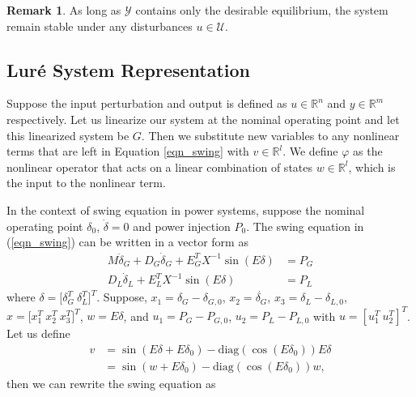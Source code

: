 \documentclass[journal]{IEEEtran}
\theoremstyle{definition}
\newtheorem*{remark}{Remark}
\begin{document}
\begin{remark}
As long as $\mathcal{Y}$ contains only the desirable equilibrium, the system remain stable under any disturbances $u\in\mathcal{U}$.
\end{remark}

\subsection{Lur\'e System Representation}
Suppose the input perturbation and output is defined as $u\in\mathbb{R}^{n}$ and $y\in\mathbb{R}^{m}$ respectively. Let us linearize our system at the nominal operating point and let this linearized system be $G$. Then we substitute new variables to any nonlinear terms that are left in Equation \ref{eqn_swing} with $v\in\mathbb{R}^{l}$. We define $\varphi$ as the nonlinear operator that acts on a linear combination of states $w\in\mathbb{R}^{l}$, which is the input to the nonlinear term.

In the context of swing equation in power systems, suppose the nominal operating point $\delta_0$, $\dot{\delta}=0$ and power injection $P_0$. The swing equation in (\ref{eqn_swing}) can be written in a vector form as
\begin{equation}
\begin{aligned}
M\ddot{\delta}_G+D_G\dot{\delta}_G+E_G^TX^{-1}\sin(E\delta)&=P_G \\
D_L\dot{\delta}_L+E_L^TX^{-1}\sin(E\delta)&=P_L
\end{aligned}
\end{equation}
where $\delta=\big[\delta_G^T \ \delta_L^T \big]^T$. Suppose, $x_1=\delta_G-\delta_{G,0}$, $x_2=\dot{\delta_G}$, $x_3=\delta_L-\delta_{L,0}$, $x=\big[x_1^T \ x_2^T \ x_3^T\big]^T$, $w=E\delta$, and $u_1=P_G-P_{G,0}$, $u_2=P_L-P_{L,0}$ with $u=[u_1^T \ u_2^T]^T$.
Let us define 
\begin{equation}
\begin{aligned}
v&=\sin(E\delta+E\delta_0)-\text{diag}(\cos(E\delta_0))E\delta \\
&=\sin(w+E\delta_0)-\text{diag}(\cos(E\delta_0))w,
\end{aligned}
\end{equation}
then we can rewrite the swing equation as
\end{document}
